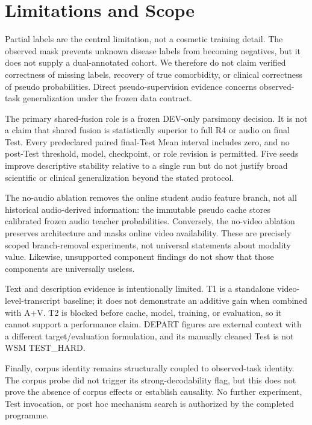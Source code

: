 \section{Limitations and Scope}

Partial labels are the central limitation, not a cosmetic training detail. The observed mask prevents unknown disease labels from becoming negatives, but it does not supply a dual-annotated cohort. We therefore do not claim verified correctness of missing labels, recovery of true comorbidity, or clinical correctness of pseudo probabilities. Direct pseudo-supervision evidence concerns observed-task generalization under the frozen data contract.

The primary shared-fusion role is a frozen DEV-only parsimony decision. It is not a claim that shared fusion is statistically superior to full R4 or audio on final Test. Every predeclared paired final-Test Mean interval includes zero, and no post-Test threshold, model, checkpoint, or role revision is permitted. Five seeds improve descriptive stability relative to a single run but do not justify broad scientific or clinical generalization beyond the stated protocol.

The no-audio ablation removes the online student audio feature branch, not all historical audio-derived information: the immutable pseudo cache stores calibrated frozen audio teacher probabilities. Conversely, the no-video ablation preserves architecture and masks online video availability. These are precisely scoped branch-removal experiments, not universal statements about modality value. Likewise, unsupported component findings do not show that those components are universally useless.

Text and description evidence is intentionally limited. T1 is a standalone video-level-transcript baseline; it does not demonstrate an additive gain when combined with A+V. T2 is blocked before cache, model, training, or evaluation, so it cannot support a performance claim. DEPART figures are external context with a different target/evaluation formulation, and its manually cleaned Test is not WSM TEST\_HARD.

Finally, corpus identity remains structurally coupled to observed-task identity. The corpus probe did not trigger its strong-decodability flag, but this does not prove the absence of corpus effects or establish causality. No further experiment, Test invocation, or post hoc mechanism search is authorized by the completed programme.
